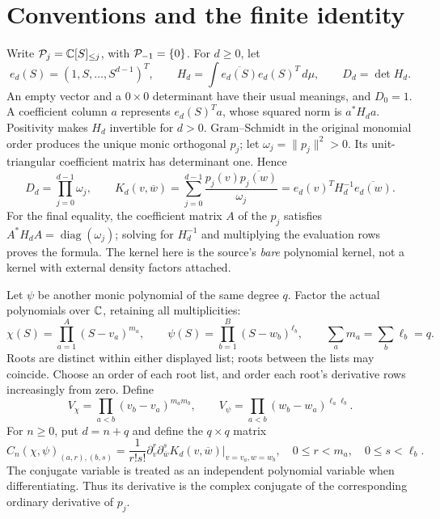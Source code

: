 \documentclass[11pt]{article}
\begin{document}
\section{Conventions and the finite identity}\label{mrfinite:sec:statement}

Write \(\mathcal P_j=\mathbb C[S]_{\leq j}\), with \(\mathcal P_{-1}=\{0\}\).
For \(d\geq0\), let
\[
 e_d(S)=(1,S,\ldots,S^{d-1})^T,\qquad
 H_d=\int\overline{e_d(S)}e_d(S)^T\,d\mu,
 \qquad D_d=\det H_d.
\]
An empty vector and a \(0\times0\) determinant have their usual meanings,
and \(D_0=1\). A coefficient column \(a\) represents \(e_d(S)^Ta\),
whose squared norm is \(a^*H_da\). Positivity makes \(H_d\) invertible
for \(d>0\). Gram--Schmidt in the original monomial order produces the
unique monic orthogonal \(p_j\); let \(\omega_j=\|p_j\|^2>0\). Its
unit-triangular coefficient matrix has determinant one. Hence
\begin{equation}\label{mrfinite:eq:kernel}
 D_d=\prod_{j=0}^{d-1}\omega_j,
 \qquad
 K_d(v,\overline w)=\sum_{j=0}^{d-1}
      \frac{p_j(v)\overline{p_j(w)}}{\omega_j}
   =e_d(v)^TH_d^{-1}\overline{e_d(w)}.
\end{equation}
For the final equality, the coefficient matrix \(A\) of the \(p_j\)
satisfies \(A^*H_dA=\operatorname{diag}(\omega_j)\); solving for
\(H_d^{-1}\) and multiplying the evaluation rows proves the formula.
The kernel here is the source's \emph{bare} polynomial kernel, not a
kernel with external density factors attached.

Let \(\psi\) be another monic polynomial of the same degree \(q\).
Factor the actual polynomials over \(\mathbb C\), retaining all multiplicities:
\[
 \chi(S)=\prod_{a=1}^{A}(S-v_a)^{m_a},\qquad
 \psi(S)=\prod_{b=1}^{B}(S-w_b)^{\ell_b},\qquad
 \sum_a m_a=\sum_b\ell_b=q.
\]
Roots are distinct within either displayed list; roots between the lists
may coincide. Choose an order of each root list, and order each root's
derivative rows increasingly from zero. Define
\begin{equation}\label{mrfinite:eq:V}
 V_\chi=\prod_{a<b}(v_b-v_a)^{m_am_b},\qquad
 V_\psi=\prod_{a<b}(w_b-w_a)^{\ell_a\ell_b}.
\end{equation}
For \(n\geq0\), put \(d=n+q\) and define the \(q\times q\) matrix
\begin{equation}\label{mrfinite:eq:C}
 C_n(\chi,\psi)_{(a,r),(b,s)}
  =\frac{1}{r!s!}
     \partial_v^r\partial_{\overline w}^{s}
           K_d(v,\overline w)\big|_{v=v_a,w=w_b},
 \quad 0\leq r<m_a,\quad0\leq s<\ell_b.
\end{equation}
The conjugate variable is treated as an independent polynomial variable
when differentiating. Thus its derivative is the complex conjugate of
the corresponding ordinary derivative of \(p_j\).
\end{document}
